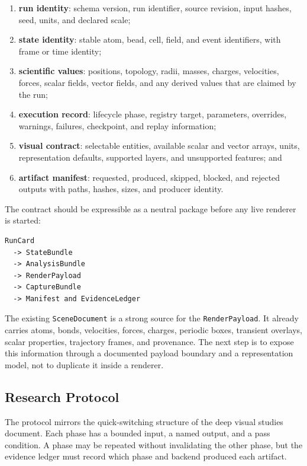 \documentclass[11pt,a4paper]{article}
\begin{document}
\begin{enumerate}
  \item \textbf{run identity}: schema version, run identifier, source
        revision, input hashes, seed, units, and declared scale;
  \item \textbf{state identity}: stable atom, bead, cell, field, and event
        identifiers, with frame or time identity;
  \item \textbf{scientific values}: positions, topology, radii, masses,
        charges, velocities, forces, scalar fields, vector fields, and any
        derived values that are claimed by the run;
  \item \textbf{execution record}: lifecycle phase, registry target,
        parameters, overrides, warnings, failures, checkpoint, and replay
        information;
  \item \textbf{visual contract}: selectable entities, available scalar and
        vector arrays, units, representation defaults, supported layers, and
        unsupported features; and
  \item \textbf{artifact manifest}: requested, produced, skipped, blocked,
        and rejected outputs with paths, hashes, sizes, and producer identity.
\end{enumerate}

The contract should be expressible as a neutral package before any live
renderer is started:

\begin{lstlisting}[style=cpp]
RunCard
  -> StateBundle
  -> AnalysisBundle
  -> RenderPayload
  -> CaptureBundle
  -> Manifest and EvidenceLedger
\end{lstlisting}

The existing \texttt{SceneDocument} is a strong source for the
\texttt{RenderPayload}.  It already carries atoms, bonds, velocities, forces,
charges, periodic boxes, transient overlays, scalar properties, trajectory
frames, and provenance.  The next step is to expose this information through
a documented payload boundary and a representation model, not to duplicate it
inside a renderer.

\subsection{Research Protocol}

The protocol mirrors the quick-switching structure of the deep visual studies
document.  Each phase has a bounded input, a named output, and a pass
condition.  A phase may be repeated without invalidating the other phase, but
the evidence ledger must record which phase and backend produced each artifact.
\end{document}
